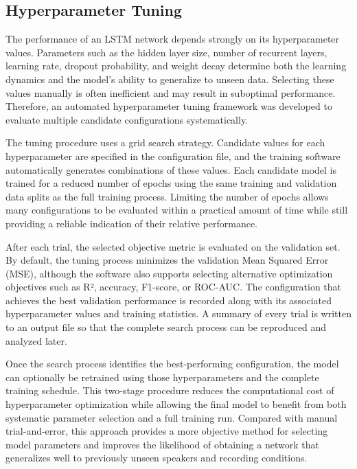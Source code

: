 \documentclass[11pt, letterpaper,titlepage]{article}
\begin{document}
\subsection{Hyperparameter Tuning}



The performance of an LSTM network depends strongly on its hyperparameter values. Parameters such as the hidden layer size, number of recurrent layers, learning rate, dropout probability, and weight decay determine both the learning dynamics and the model's ability to generalize to unseen data. Selecting these values manually is often inefficient and may result in suboptimal performance. Therefore, an automated hyperparameter tuning framework was developed to evaluate multiple candidate configurations systematically.

The tuning procedure uses a grid search strategy. Candidate values for each hyperparameter are specified in the configuration file, and the training software automatically generates combinations of these values. Each candidate model is trained for a reduced number of epochs using the same training and validation data splits as the full training process. Limiting the number of epochs allows many configurations to be evaluated within a practical amount of time while still providing a reliable indication of their relative performance.

After each trial, the selected objective metric is evaluated on the validation set. By default, the tuning process minimizes the validation Mean Squared Error (MSE), although the software also supports selecting alternative optimization objectives such as R², accuracy, F1-score, or ROC-AUC. The configuration that achieves the best validation performance is recorded along with its associated hyperparameter values and training statistics. A summary of every trial is written to an output file so that the complete search process can be reproduced and analyzed later.

Once the search process identifies the best-performing configuration, the model can optionally be retrained using those hyperparameters and the complete training schedule. This two-stage procedure reduces the computational cost of hyperparameter optimization while allowing the final model to benefit from both systematic parameter selection and a full training run. Compared with manual trial-and-error, this approach provides a more objective method for selecting model parameters and improves the likelihood of obtaining a network that generalizes well to previously unseen speakers and recording conditions.
\end{document}
